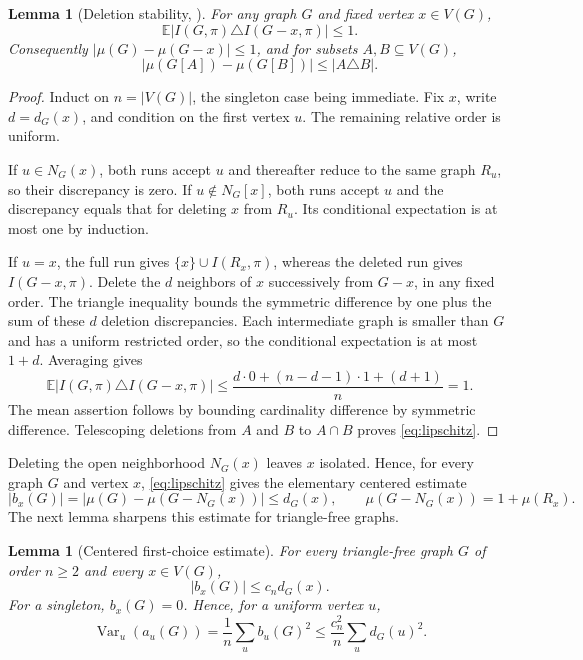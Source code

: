 \documentclass[11pt]{article}
\newcommand{\E}{\mathbb E}
\newcommand{\Var}{\operatorname{Var}}
\newtheorem{lemma}[theorem]{Lemma}
\begin{document}
\begin{lemma}[Deletion stability, {\cite[Theorem~1]{CHHK}}]\label{lem:deletion}
For any graph $G$ and fixed vertex $x\in V(G)$,
\begin{equation}\label{eq:stability}
 \E|I(G,\pi)\triangle I(G-x,\pi)|\le1.
\end{equation}
Consequently $|\mu(G)-\mu(G-x)|\le1$, and for subsets $A,B\subseteq V(G)$,
\begin{equation}\label{eq:lipschitz}
 |\mu(G[A])-\mu(G[B])|\le |A\triangle B|.
\end{equation}
\end{lemma}

\begin{proof}
Induct on $n=|V(G)|$, the singleton case being immediate. Fix $x$, write $d=d_G(x)$, and condition on the first vertex $u$. The remaining relative order is uniform.

If $u\in N_G(x)$, both runs accept $u$ and thereafter reduce to the same graph $R_u$, so their discrepancy is zero. If $u\notin N_G[x]$, both runs accept $u$ and the discrepancy equals that for deleting $x$ from $R_u$. Its conditional expectation is at most one by induction.

If $u=x$, the full run gives $\{x\}\cup I(R_x,\pi)$, whereas the deleted run gives $I(G-x,\pi)$. Delete the $d$ neighbors of $x$ successively from $G-x$, in any fixed order. The triangle inequality bounds the symmetric difference by one plus the sum of these $d$ deletion discrepancies. Each intermediate graph is smaller than $G$ and has a uniform restricted order, so the conditional expectation is at most $1+d$. Averaging gives
\[
 \E|I(G,\pi)\triangle I(G-x,\pi)|
 \le\frac{d\cdot0+(n-d-1)\cdot1+(d+1)}n=1.
\]
The mean assertion follows by bounding cardinality difference by symmetric difference. Telescoping deletions from $A$ and $B$ to $A\cap B$ proves \eqref{eq:lipschitz}.
\end{proof}

Deleting the open neighborhood $N_G(x)$ leaves $x$ isolated. Hence, for every graph $G$ and vertex $x$, \eqref{eq:lipschitz} gives the elementary centered estimate
\begin{equation}\label{eq:crude-bias}
 |b_x(G)|=|\mu(G)-\mu(G-N_G(x))|\le d_G(x),
 \qquad \mu(G-N_G(x))=1+\mu(R_x).
\end{equation}
The next lemma sharpens this estimate for triangle-free graphs.

\begin{lemma}[Centered first-choice estimate]\label{lem:centered}
For every triangle-free graph $G$ of order $n\ge2$ and every $x\in V(G)$,
\begin{equation}\label{eq:centered}
 |b_x(G)|\le c_n d_G(x).
\end{equation}
For a singleton, $b_x(G)=0$. Hence, for a uniform vertex $u$,
\begin{equation}\label{eq:between}
 \Var_u(a_u(G))=\frac1n\sum_u b_u(G)^2
 \le\frac{c_n^2}{n}\sum_u d_G(u)^2.
\end{equation}
\end{lemma}
\end{document}
